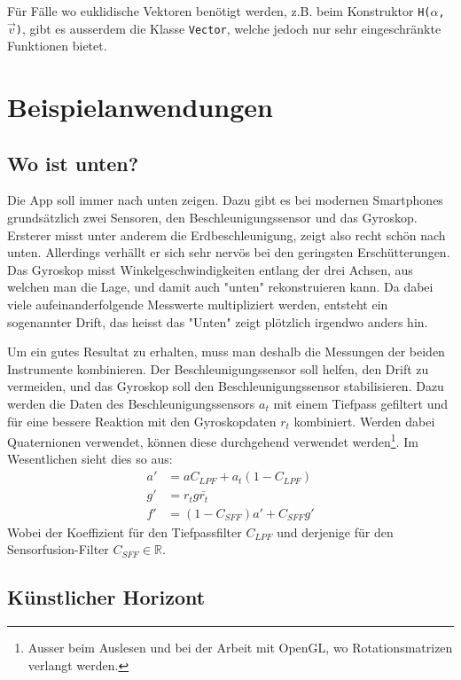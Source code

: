 \documentclass[12pt]{article}
\begin{document}
  Für Fälle wo euklidische Vektoren benötigt werden, z.B. beim Konstruktor \texttt{H($\alpha$, $\vec{v}$)}, gibt es ausserdem die Klasse \texttt{Vector}, welche jedoch nur sehr eingeschränkte Funktionen bietet.

  \section{Beispielanwendungen}
  \subsection{Wo ist unten?}

  Die App soll immer nach unten zeigen. Dazu gibt es bei modernen Smartphones grundsätzlich zwei Sensoren, den Beschleunigungssensor und das Gyroskop. Ersterer misst unter anderem die Erdbeschleunigung, zeigt also recht schön nach unten. Allerdings verhällt er sich sehr nervös bei den geringsten Erschütterungen. Das Gyroskop misst Winkelgeschwindigkeiten entlang der drei Achsen, aus welchen man die Lage, und damit auch "unten" rekonstruieren kann. Da dabei viele aufeinanderfolgende Messwerte multipliziert werden, entsteht ein sogenannter Drift, das heisst das "Unten" zeigt plötzlich irgendwo anders hin.

  Um ein gutes Resultat zu erhalten, muss man deshalb die Messungen der beiden Instrumente kombinieren. Der Beschleunigungssensor soll helfen, den Drift zu vermeiden, und das Gyroskop soll den Beschleunigungssensor stabilisieren. Dazu werden die Daten des Beschleunigungssensors $a_t$ mit einem Tiefpass gefiltert und für eine bessere Reaktion mit den Gyroskopdaten $r_t$ kombiniert. Werden dabei Quaternionen verwendet, können diese durchgehend verwendet werden\footnote{Ausser beim Auslesen und bei der Arbeit mit OpenGL, wo Rotationsmatrizen verlangt werden.}. Im Wesentlichen sieht dies so aus:
  \begin{align*}
    a' &= a C_{LPF} +  a_t (1 - C_{LPF}) \\
    g' &= r_t g \bar{r_t}    \\
    f' &= (1 - C_{SFF}) a' + C_{SFF} g'
  \end{align*}
  Wobei der Koeffizient für den Tiefpassfilter $C_{LPF}$ und derjenige für den Sensorfusion-Filter $C_{SFF} \in \mathbb{R}$.


  \subsection{Künstlicher Horizont}
\end{document}
